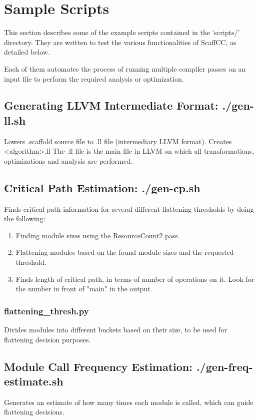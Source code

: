 \section{Sample Scripts}
This section describes some of the example scripts contained in the `scripts/' directory. They are written to test the various functionalities 
of ScaffCC, as detailed below.

Each of them automates the process of running multiple compiler passes on an input file to perform the required analysis or optimization.


\subsection{Generating LLVM Intermediate Format: ./gen-ll.sh}

Lowers .scaffold source file to .ll file (intermediary LLVM format). Creates \textless algorithm\textgreater.ll
The .ll file is the main file in LLVM on which all transformations, optimizations and analysis are performed.


\subsection{Critical Path Estimation: ./gen-cp.sh}

Finds critical path information for several different flattening thresholds by doing the following:
\begin{enumerate}
\item Finding module sizes using the ResourceCount2 pass.
\item Flattening modules based on the found module sizes and the requested threshold.
\item Finds length of critical path, in terms of number of operations on it. Look for the number in front of "main" in the output. 
\end{enumerate}

\subsubsection{flattening\_thresh.py} 
Divides modules into different buckets based on their size, to be used for flattening decision purposes.


\subsection{Module Call Frequency Estimation: ./gen-freq-estimate.sh}
Generates an estimate of how many times each module is called, which can guide flattening decisions.



